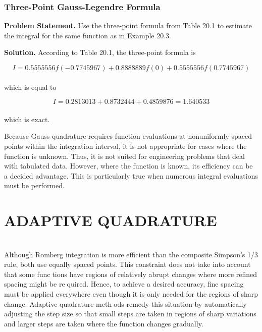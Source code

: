 \subsection{Three-Point Gauss-Legendre Formula}
\textbf{Problem Statement.} Use the three-point formula from Table 20.1 to estimate the integral for the same function as in Example 20.3.

\textbf{Solution.} According to Table 20.1, the three-point formula is

	$$I=0.5555556f(−0.7745967)+ 0.8888889 f (0) + 0.5555556 f (0.7745967)$$\\
which is equal to

	$$I = 0.2813013 + 0.8732444 + 0.4859876 = 1.640533$$\\
which is exact.

\vspace{0.6in}

Because Gauss quadrature requires function evaluations at nonuniformly spaced points
within the integration interval, it is not appropriate for cases where the function is unknown.
Thus, it is not suited for engineering problems that deal with tabulated data. However, where
the function is known, its efficiency can be a decided advantage. This is particularly true
when numerous integral evaluations must be performed.

\vspace{0,6in}
\chapter{ADAPTIVE QUADRATURE}
\vspace{0,1in}
\hline\\
\vspace{0,1in}
Although Romberg integration is more efficient than the composite Simpson’s 1/3 rule,
both use equally spaced points. This constraint does not take into account that some functions have regions of relatively abrupt changes where more refined spacing might be required. Hence, to achieve a desired accuracy, fine spacing must be applied everywhere
even though it is only needed for the regions of sharp change. Adaptive quadrature methods remedy this situation by automatically adjusting the step size so that small steps are
taken in regions of sharp variations and larger steps are taken where the function changes
gradually.


